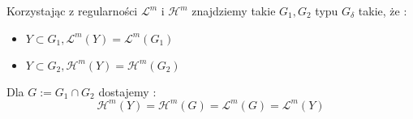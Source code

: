 Korzystając z regularności $\mathcal{L}^m$ i $\mathcal{H}^m$ znajdziemy takie $G_1, G_2$ typu $G_{\delta}$ takie, że :
\begin{itemize}
\item $Y \subset G_1, \mathcal{L}^m(Y) = \mathcal{L}^m(G_1)$ 
\item $Y \subset G_2, \mathcal{H}^m(Y) = \mathcal{H}^m(G_2)$
\end{itemize}
Dla $G := G_1 \cap G_2$ dostajemy :
$$
    \mathcal{H}^m(Y) = \mathcal{H}^m(G) = \mathcal{L}^m(G) = \mathcal{L}^m(Y)
$$